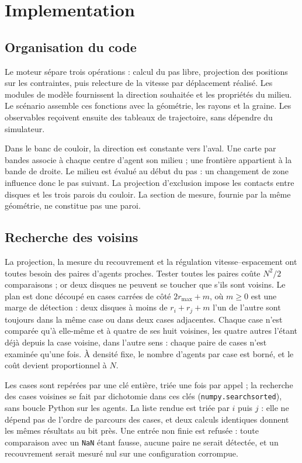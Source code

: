 \section{Implementation}
\label{sec:implementation}


\subsection{Organisation du code}

Le moteur sépare trois opérations : calcul du pas libre, projection des positions
sur les contraintes, puis relecture de la vitesse par déplacement réalisé.
Les modules de modèle fournissent la direction souhaitée et les propriétés du milieu.
Le scénario assemble ces fonctions avec la géométrie, les rayons et la graine.
Les observables reçoivent ensuite des tableaux de trajectoire, sans dépendre du simulateur.

Dans le banc de couloir, la direction est constante vers l'aval. Une carte par bandes
associe à chaque centre d'agent son milieu ; une frontière appartient à la bande de droite.
Le milieu est évalué au début du pas : un changement de zone influence donc le pas suivant.
La projection d'exclusion impose les contacts entre disques et les trois parois du couloir.
La section de mesure, fournie par la même géométrie, ne constitue pas une paroi.

\subsection{Recherche des voisins}
\label{sec:voisins}

La projection, la mesure du recouvrement et la régulation vitesse--espacement
ont toutes besoin des paires d'agents proches. Tester toutes les paires coûte $N^2/2$
comparaisons ; or deux disques ne peuvent se toucher que s'ils sont voisins. Le
plan est donc découpé en cases carrées de côté $2r_{\max}+m$, où $m\geq0$ est
une marge de détection : deux disques à moins de $r_i+r_j+m$ l'un de l'autre sont
toujours dans la même case ou dans deux cases adjacentes. Chaque case n'est
comparée qu'à elle-même et à quatre de ses huit voisines, les quatre autres
l'étant déjà depuis la case voisine, dans l'autre sens : chaque paire de cases
n'est examinée qu'une fois. À densité fixe, le nombre d'agents par case est
borné, et le coût devient proportionnel à $N$.

Les cases sont repérées par une clé entière, triée une fois par appel ; la
recherche des cases voisines se fait par dichotomie dans ces clés
(\texttt{numpy.searchsorted}), sans boucle Python sur les agents. La liste rendue
est triée par $i$ puis $j$ : elle ne dépend pas de l'ordre de parcours des cases,
et deux calculs identiques donnent les mêmes résultats au bit près. Une entrée non finie est refusée : toute comparaison avec un \texttt{NaN}
étant fausse, aucune paire ne serait détectée, et un recouvrement serait mesuré
nul sur une configuration corrompue.

